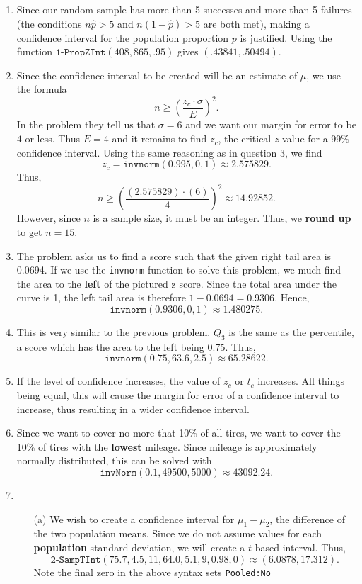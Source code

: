 \documentclass{article}
\newcommand{\answer}[1]{{\color{red}{\large \textbf{#1}}}}
\begin{document}
\begin{enumerate}
\item \answer{A} Since our random sample has more than 5 successes and more than 5 failures (the conditions $n\hat{p} >5$ and $n(1-\hat{p}) >5$ are both met), making a confidence interval for the population proportion $p$ is justified. Using the function $\texttt{1-PropZInt}(408, 865, .95)$ gives $(.43841, .50494)$.

\item \answer{C} Since the confidence interval to be created will be an estimate of $\mu$, we use the formula $$n \geq \left(\frac{z_c \cdot \sigma}{E}\right)^2.$$
In the problem they tell us that $\sigma = 6$ and we want our margin for error to be $4$ or less. Thus $E=4$ and it remains to find $z_c$, the critical $z$-value for a 99\% confidence interval. Using the same reasoning as in question 3, we find $$z_c = \texttt{invnorm}(0.995, 0, 1) \approx 2.575829.$$
Thus, $$ n\geq \left( \frac{(2.575829)\cdot(6)}{4} \right)^2 \approx 14.92852.$$
However, since $n$ is a sample size, it must be an integer. Thus, we \textbf{round up} to get $n=15$.

\item \answer{A} The problem asks us to find a score such that the given right tail area is 0.0694. If we use the \texttt{invnorm} function to solve this problem, we much find the area to the \textbf{left} of the pictured z score. Since the total area under the curve is 1, the left tail area is therefore $1-0.0694 = 0.9306$. Hence, $$\texttt{invnorm}(0.9306, 0, 1) \approx 1.480275.$$

\item \answer{D} This is very similar to the previous problem. $Q_3$ is the same as the  percentile, a score which has the area to the left being 0.75. Thus,
$$\texttt{invnorm}(0.75, 63.6, 2.5) \approx 65.28622.$$

\item \answer{C} If the level of confidence increases, the value of $z_c$ or $t_c$ increases. All things being equal, this will cause the margin for error of a confidence interval to increase, thus resulting in a wider confidence interval.

\item \answer{$\approx 43,100$} Since we want to cover no more that 10\% of all tires, we want to cover the 10\% of tires with the \textbf{lowest} mileage. Since mileage is approximately normally distributed, this can be solved with $$\texttt{invNorm}(0.1, 49500, 5000) \approx 43092.24.$$

\item \begin{enumerate} \item[(a)] \answer{$\approx (6.0878, 17.312)$} We wish to create a confidence interval for $\mu_1 - \mu_2$, the difference of the two population means. Since we do not assume values for each \textbf{population} standard deviation, we will create a $t$-based interval. Thus, $$\texttt{2-SampTInt}(75.7, 4.5, 11, 64.0, 5.1, 9, 0.98, 0) \approx (6.0878, 17.312).$$
Note the final zero in the above syntax sets \texttt{Pooled:No}


\end{enumerate}
\end{enumerate}
\end{document}
